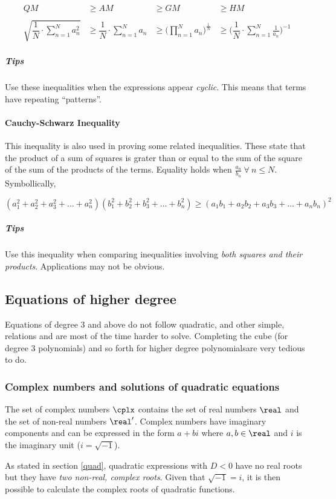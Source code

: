 \begin{align*}
  QM &\geq AM &\geq GM &\geq HM \\ \\
  \sqrt{\dfrac{1}{N}\cdot \sum\limits_{n=1}^{N} a_n^2} &\geq \dfrac{1}{N}\cdot \sum\limits_{n=1}^{N} a_n &\geq \Big(\prod_{n=1}^{N}a_n \Big)^{\frac{1}{N}} &\geq \Big(\dfrac{1}{N}\cdot \sum\limits_{n=1}^{N}\frac{1}{a_n}\Big)^{-1}
\end{align*}

\subparagraph{Tips}
Use these inequalities when the expressions appear \emph{cyclic}.
This means that terms have repeating ``patterns''.

\paragraph{Cauchy-Schwarz Inequality}
This inequality is also used in proving some related inequalities.
These state that the product of a sum of squares is grater than or equal to the sum of the square of the sum of the products of the terms.
Equality holds when $\frac{a_n}{b_n}\ \forall\ n\leq N$.
Symbollically,

$$
(a_1^2+a_2^2+a_3^2+\ldots +a_n^2)(b_1^2+b_2^2+b_3^2+\ldots +b_n^2) \geq (a_1b_1+a_2b_2+a_3b_3+\ldots +a_nb_n)^2 
$$

\subparagraph{Tips}
Use this inequality when comparing inequalities involving \emph{both squares and their products}.
Applications may not be obvious.

\subsection{Equations of higher degree}
Equations of degree $3$ and above do not follow quadratic, and other simple, relations and are most of the time harder to solve.
Completing the cube (for degree 3 polynomials) and so forth for higher degree polynomialsare very tedious to do.

\subsubsection{Complex numbers and solutions of quadratic equations}
The set of complex numbers $\cplx$ contains the set of real numbers $\real$ and the set of non-real numbers $\real '$.
Complex numbers have imaginary components and can be expressed in the form $a + bi$ where $a, b \in \real$ and $i$ is the imaginary unit ($i = \sqrt{-1}$).

As stated in section \ref{quad}, quadratic expressions with $D < 0$ have no real roots but they have \emph{two non-real, complex roots}.
Given that $\sqrt{-1} = i$, it is then possible to calculate the complex roots of quadratic functions.

